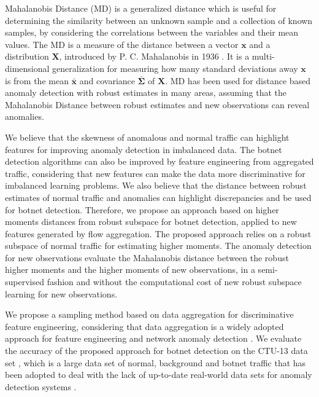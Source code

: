 \documentclass[review]{elsarticle}
\begin{document}
Mahalanobis Distance (MD) is a generalized distance which is useful for determining the similarity between an unknown sample and a collection of known samples, by considering the correlations between the variables and their mean values. The MD is a measure of the distance between a vector $\boldsymbol{x}$ and a distribution $\boldsymbol{X}$, introduced by P. C. Mahalanobis in 1936 \cite{mahalanobis1936md}. It is a multi-dimensional generalization for measuring how many standard deviations away $\boldsymbol{x}$ is from the mean $\boldsymbol{\bar{x}}$ and covariance $\boldsymbol{\bar{\Sigma}}$ of $\boldsymbol{X}$. MD has been used for distance based anomaly detection with robust estimates in many areas, assuming that the Mahalanobis Distance between robust estimates and new observations can reveal anomalies.

We believe that the skewness of anomalous and normal traffic can highlight features for improving anomaly detection in imbalanced data. The botnet detection algorithms can also be improved by feature engineering from aggregated traffic, considering that new features can make the data more discriminative for imbalanced learning problems. We also believe that the distance between robust estimates of normal traffic and anomalies can highlight discrepancies and be used for botnet detection. Therefore, we propose an approach based on higher moments distances from robust subspace for botnet detection, applied to new features generated by flow aggregation. The proposed approach relies on a robust subspace of normal traffic for estimating higher moments. The anomaly detection for new observations evaluate the Mahalanobis distance between the robust higher moments and the higher moments of new observations, in a semi-supervised fashion and without the computational cost of new robust subspace learning for new observations.

We propose a sampling method based on data aggregation for discriminative feature engineering, considering that data aggregation is a widely adopted approach for feature engineering \cite{garcia2014empirical, chandrashekar2014survey,acarali2016survey} and network anomaly detection \cite{lakhina2005mining, callegari2011novel, vieira2017model}. We evaluate the accuracy of the proposed approach for botnet detection on the CTU-13 data set \cite{garcia2014empirical}, which is a large data set of normal, background and botnet traffic that has been adopted to deal with the lack of up-to-date real-world data sets for anomaly detection systems \cite{osanaiye2016distributed}.
\end{document}

